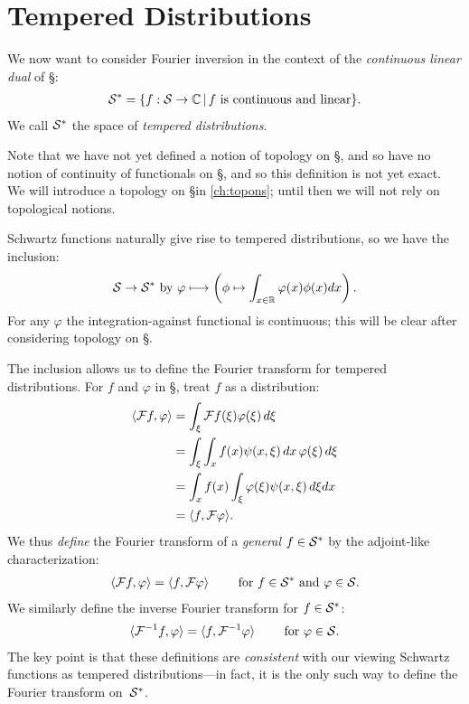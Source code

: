     \section{Tempered Distributions}
      \label{sec:tempdist}
      We now want to consider Fourier inversion in the context of the \emph{continuous linear dual} of \S:
      \begin{align*}
        \S^* = \{f:\S\rightarrow\C\,\vert\,f\text{ is continuous and linear}\} \text{.}
      \end{align*}
      We call $\S^*$ the space of \emph{tempered distributions}.

      Note that we have not yet defined a notion of topology on \S, and so have no notion of continuity of functionals on \S, and so this definition is not yet exact.
      We will introduce a topology on \S in \cref{ch:topons}; until then we will not rely on topological notions.

      Schwartz functions naturally give rise to tempered distributions, so we have the inclusion:
      \begin{align*}
        \S\rightarrow\S^*\text{ by }\varphi \longmapsto\left(\phi\mapsto\int_{x\in\R}\varphi(x)\phi(x)dx\right) \text{.}
      \end{align*}
      For any $\varphi$ the integration-against functional is continuous; this will be clear after considering topology on \S.
      
      The inclusion allows us to define the Fourier transform for tempered distributions.
      For $f$ and $\varphi$ in \S, treat $f$ as a distribution:
      \begin{align*}
        \langle\F f,\varphi\rangle &= \int_\xi\F f(\xi)\varphi(\xi)\,d\xi\\
        &= \int_\xi\int_xf(x)\psi(x,\xi)\,dx\,\varphi(\xi)\,d\xi\\
        &= \int_xf(x)\int_\xi\varphi(\xi)\psi(x,\xi)\,d\xi dx\\
        &= \langle f,\F\varphi\rangle \text{.}
      \end{align*}
      We thus \emph{define} the Fourier transform of a \emph{general} $f\in\S^*$ by the adjoint-like characterization:
      \begin{align*}
        \langle\F f,\varphi\rangle = \langle f,\F\varphi\rangle\qquad\text{ for }f\in\S^*\text{ and }\varphi\in\S \text{.}
      \end{align*}
      We similarly define the inverse Fourier transform for $f\in\S^*$:
      \begin{align*}
        \langle\F^{-1}f,\varphi\rangle = \langle f,\F^{-1}\varphi\rangle\qquad\text{ for }\varphi\in\S \text{.}
      \end{align*}
      The key point is that these definitions are \emph{consistent} with our viewing Schwartz functions as tempered distributions---in fact, it is the only such way to define the Fourier transform on~$\S^*$.

